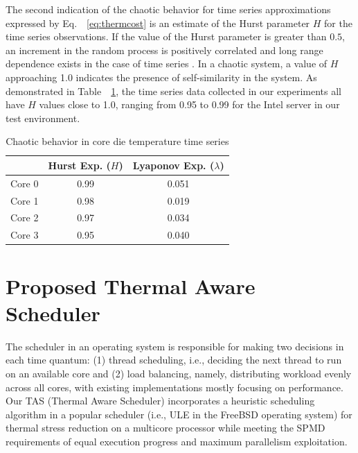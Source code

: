 \documentclass[times, 10pt,twocolumn]{IEEEtran}
\newcommand{\equationnames}{Eq.\ }
\begin{document}
The second indication of the chaotic behavior for time series
approximations expressed by \equationnames~\eqref{eq:thermcost} is an
estimate of the Hurst parameter $H$ for the time series observations. If
the value of the Hurst parameter is greater than $0.5$, an increment in
the random process is positively correlated and long range dependence
exists in the case of time series \cite{Sprott2003}.  In a chaotic
system, a value of $H$ approaching 1.0 indicates the presence of
self-similarity in the system.  As demonstrated in
Table~~\ref{tab:chaotic}, the time series data collected in our
experiments all have $H$ values close to 1.0, ranging from 0.95 to 0.99
for the Intel server in our test environment.
\begin{table}[tbhp]
  \caption{Chaotic behavior in core die temperature time series}
  \label{tab:chaotic} 
   \centering 
\begin{tabular}{lcc}
\hline
 & Hurst Exp. ($H$) & Lyaponov Exp. ($\lambda$) \\
\hline
Core 0 & 0.99 & 0.051 \\
Core 1 & 0.98 & 0.019 \\
Core 2 & 0.97 & 0.034 \\
Core 3 & 0.95 & 0.040 \\
\hline
\end{tabular}

\end{table}

\newline
\section{Proposed Thermal Aware Scheduler}
\label{sec:sdesign} 
The scheduler in an operating system is responsible for making two
decisions in each time quantum: (1) thread scheduling, i.e., deciding
the next thread to run on an available core and (2) load balancing,
namely, distributing workload evenly across all cores, with existing
implementations mostly focusing on performance.  Our TAS (Thermal Aware
Scheduler) incorporates a heuristic scheduling algorithm in a popular
scheduler (i.e., ULE in the FreeBSD operating system) for thermal stress
reduction on a multicore processor while meeting the SPMD requirements
of equal execution progress and maximum parallelism exploitation.
\end{document}
